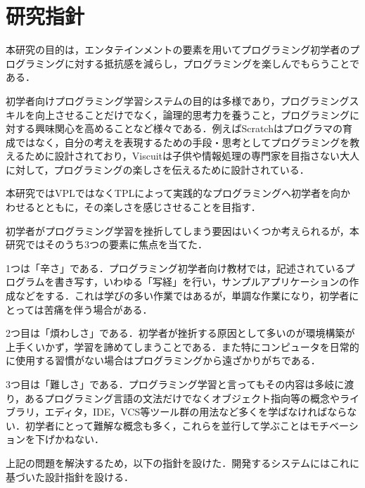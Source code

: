 \section{研究指針}

本研究の目的は，エンタテインメントの要素を用いてプログラミング初学者のプログラミングに対する抵抗感を減らし，プログラミングを楽しんでもらうことである．


初学者向けプログラミング学習システムの目的は多様であり，プログラミングスキルを向上させることだけでなく，論理的思考力を養うこと，プログラミングに対する興味関心を高めることなど様々である．例えばScratchはプログラマの育成ではなく，自分の考えを表現するための手段・思考としてプログラミングを教えるために設計されており，Viscuitは子供や情報処理の専門家を目指さない大人に対して，プログラミングの楽しさを伝えるために設計されている．

本研究ではVPLではなくTPLによって実践的なプログラミングへ初学者を向かわせるとともに，その楽しさを感じさせることを目指す．


初学者がプログラミング学習を挫折してしまう要因はいくつか考えられるが，本研究ではそのうち3つの要素に焦点を当てた．

1つは「辛さ」である．プログラミング初学者向け教材では，記述されているプログラムを書き写す，いわゆる「写経」を行い，サンプルアプリケーションの作成などをする．これは学びの多い作業ではあるが，単調な作業になり，初学者にとっては苦痛を伴う場合がある．


2つ目は「煩わしさ」である．初学者が挫折する原因として多いのが環境構築が上手くいかず，学習を諦めてしまうことである．また特にコンピュータを日常的に使用する習慣がない場合はプログラミングから遠ざかりがちである．


3つ目は「難しさ」である．プログラミング学習と言ってもその内容は多岐に渡り，あるプログラミング言語の文法だけでなくオブジェクト指向等の概念やライブラリ，エディタ，IDE，VCS等ツール群の用法など多くを学ばなければならない．初学者にとって難解な概念も多く，これらを並行して学ぶことはモチベーションを下げかねない．

上記の問題を解決するため，以下の指針を設けた．開発するシステムにはこれに基づいた設計指針を設ける．

